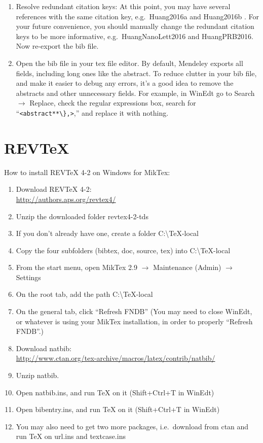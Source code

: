\documentclass[aps,prb,twocolumn,superscriptaddress,floatfix,longbibliography]{revtex4-2}
\begin{document}
\begin{enumerate}
\item Resolve redundant citation keys: At this point, you may have several references with the same citation key, e.g.\ Huang2016a and Huang2016b \cite{HuangNanoLett2016, HuangPRB2016}. For your future convenience, you should manually change the redundant citation keys to be more informative, e.g.\ HuangNanoLett2016 and HuangPRB2016. Now re-export the bib file.
\item Open the bib file in your tex file editor. By default, Mendeley exports all fields, including long ones like the abstract. To reduce clutter in your bib file, and make it easier to debug any errors, it's a good idea to remove the abstracts and other unnecessary fields. For example, in WinEdt go to Search $\rightarrow$ Replace, check the regular expressions box, search for ``{\tt <abstract**\textbackslash\},>},'' and replace it with nothing.
\end{enumerate}

\section{\label{app:REVTeX}REVTeX}

\noindent How to install REVTeX 4-2 on Windows for MikTex:
\begin{enumerate}
\item Download REVTeX 4-2:\\ \url{http://authors.aps.org/revtex4/}
\item Unzip the downloaded folder revtex4-2-tds
\item If you don't already have one, create a folder C:\textbackslash TeX-local
\item Copy the four subfolders (bibtex, doc, source, tex) into C:\textbackslash TeX-local
\item From the start menu, open MikTex 2.9 $\rightarrow$ Maintenance (Admin) $\rightarrow$ Settings
\item On the root tab, add the path C:\textbackslash TeX-local
\item On the general tab, click ``Refresh FNDB''
(You may need to close WinEdt, or whatever is using your MikTex installation, in order to properly ``Refresh FNDB''.)
\item Download natbib:\\
\url{http://www.ctan.org/tex-archive/macros/latex/contrib/natbib/}
\item Unzip natbib.
\item Open natbib.ins, and run TeX on it (Shift+Ctrl+T in WinEdt)
\item Open bibentry.ins, and run TeX on it (Shift+Ctrl+T in WinEdt)
\item You may also need to get two more packages, i.e.\ download from ctan and run TeX on url.ins and textcase.ins
\end{enumerate}


\end{document}
